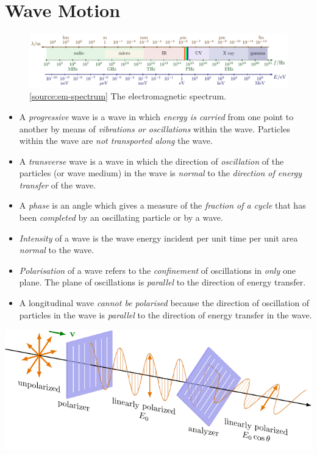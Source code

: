 \documentclass[oneside]{book}
\begin{document}
\chapter{Wave Motion}
\begin{figure}[H]
    \centering
    \includegraphics[width=\textwidth]{../images/em-spectrum/em-spectrum.pdf}
    \caption{\ref{source:em-spectrum} The electromagnetic spectrum.}
    \label{fig:em-spectrum}
\end{figure}
\begin{itemize}
    \item A \emph{progressive} wave is a wave in which \emph{energy is carried} from one point to another by means of \emph{vibrations or oscillations} within the wave. Particles within the wave are \emph{not transported along} the wave.
    \item A \emph{transverse} wave is a wave in which the direction of \emph{oscillation} of the particles (or wave
    medium) in the wave is \emph{normal} to the \emph{direction of energy transfer} of the wave.
    \item A \emph{phase} is an angle which gives a measure of the \emph{fraction of a cycle} that has been \emph{completed} by an oscillating particle or by a wave.
    \item \emph{Intensity} of a wave is the wave energy incident per unit time per unit area \emph{normal} to the wave.
    \item \emph{Polarisation} of a wave refers to the \emph{confinement} of oscillations in \emph{only} one plane. The plane of oscillations is \emph{parallel} to the direction of energy transfer.  
    \item A longitudinal wave \emph{cannot be polarised} because the direction of oscillation of particles in the wave is \emph{parallel} to the direction of energy transfer in the wave.
\end{itemize}
\begin{minipage}{3cm+15.2363pt}
    \includegraphics[page=4]{../images/Malus'-Law/Malus'-Law.pdf}
\end{minipage}%
\end{document}
